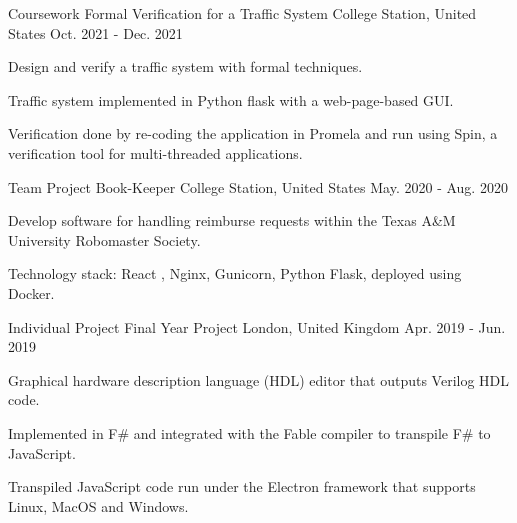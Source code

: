 
\begin{cventries}

    \cventry
    {Coursework}
    {Formal Verification for a Traffic System}
    {College Station, United States}
    {Oct. 2021 - Dec. 2021}
    {
        \begin{cvitems}
            \item Design and verify a traffic system with formal techniques.
            \item Traffic system implemented in Python flask with a web-page-based GUI.
            \item Verification done by re-coding the application in Promela and run using Spin, a verification tool for multi-threaded applications.
        \end{cvitems}
    }
    
    \cventry
    {Team Project}
    {Book-Keeper}
    {College Station, United States}
    {May. 2020 - Aug. 2020}
    {
        \begin{cvitems}
            \item Develop software for handling reimburse requests within the Texas A\&M University Robomaster Society.
            \item Technology stack: React , Nginx, Gunicorn, Python Flask, deployed using Docker.
        \end{cvitems}
    }
    
    \cventry
    {Individual Project} %
    {Final Year Project} %
    {London, United Kingdom} %
    {Apr. 2019 - Jun. 2019} %
    {
      \begin{cvitems} %
        \item {Graphical hardware description language (HDL) editor that outputs Verilog HDL code.}
        \item {Implemented in F\# and integrated with the Fable compiler to transpile F\# to JavaScript.}
        \item {Transpiled JavaScript code run under the Electron framework that supports Linux, MacOS and Windows.}
      \end{cvitems}
    }
    

\end{cventries}
